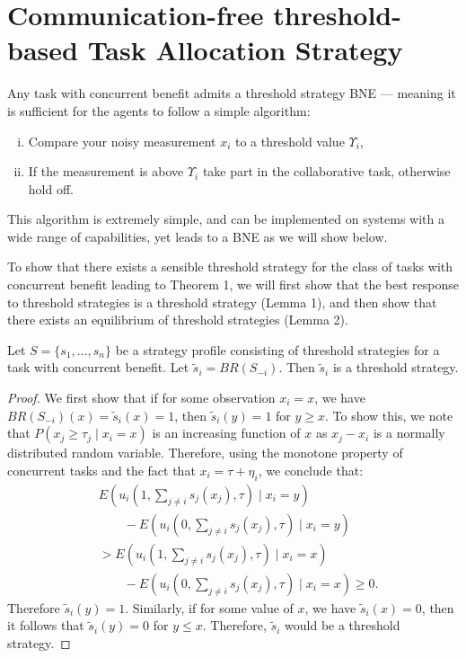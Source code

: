 \documentclass[smallextended]{svjour3}       %
\def\td{\Upsilon}     %
\begin{document}
\section{Communication-free threshold-based Task Allocation Strategy}\label{sec:discretethreshold}
Any task with concurrent benefit admits a threshold strategy BNE --- meaning it is sufficient for the agents to follow a simple algorithm: 
\begin{enumerate}[(i)]
\item Compare your noisy measurement $x_i$ to a threshold value $\td_i$,
\item If the measurement is above $\td_i$ take part in the collaborative task, otherwise hold off.
\end{enumerate}
This algorithm is extremely simple, and can be implemented on systems with a wide range of capabilities, yet leads to a BNE as we will show below.

To show that there exists a sensible threshold strategy for the class of tasks with concurrent benefit leading to Theorem 1, we will first show that the best response to threshold strategies is a threshold strategy (Lemma 1), and then show that there exists an equilibrium of threshold strategies \citep{Carlsson1993,Morris2000} (Lemma 2).

\setcounter{lemma}{0}

\begin{lemma}
Let $S=\{s_1,\ldots,s_n\}$ be a strategy profile consisting of threshold strategies for a task with  concurrent benefit. Let $\tilde{s}_i=BR(S_{-i})$. Then $\tilde{s}_i$ is a threshold strategy. 
\end{lemma} 

\begin{proof}
We first show that if for some observation $x_i=x$, we have $BR(S_{-i})(x)=\tilde{s}_i(x)=1$, then $\tilde{s}_i(y)=1$ for $y\geq x$. To show this,  we note that $P(x_j\geq \tau_j\mid x_i=x)$ is an increasing function of $x$ as $x_j-x_i$ is a normally distributed random variable. Therefore, using the monotone property of concurrent tasks and the fact that $x_i=\tau+\eta_i$, we conclude that:
\vspace{-5px}
\begin{align*}
&E(u_i(1,\sum_{j\not=i}s_j(x_j),\tau)\mid x_i=y)\\ 
&\qquad-E(u_i(0,\sum_{j\not=i}s_j(x_j),\tau)\mid x_i=y)\\ 
&>E(u_i(1,\sum_{j\not=i}s_j(x_j),\tau)\mid x_i=x)\\
&\qquad-E(u_i(0,\sum_{j\not=i}s_j(x_j),\tau)\mid x_i=x)\geq 0.
\end{align*}
Therefore $\tilde{s}_i(y)=1$. Similarly, if for some value of $x$, we have $\tilde{s}_i(x)=0$, then it follows that $\tilde{s}_i(y)=0$ for $y\leq x$. Therefore, $\tilde{s}_i$ would be a threshold strategy.  
\end{proof}
\end{document}
